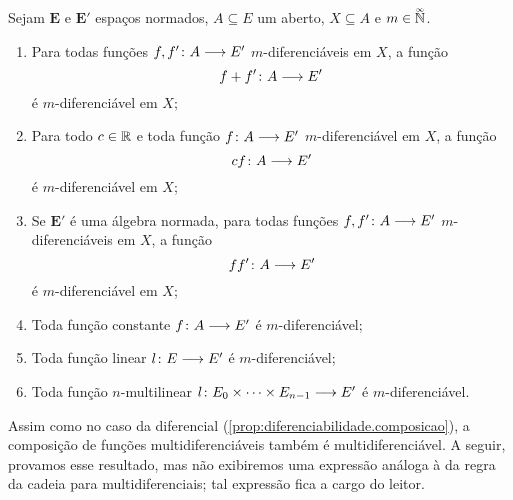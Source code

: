 \begin{exercise}
\label{prop:multidiferencial.propriedades}
Sejam $\bm E$ e $\bm E'$ espaços normados, $A \subseteq E$ um aberto, $X \subseteq A$ e $m \in \accentset{\infty}{\mathbb{N}}$.
	\begin{enumerate}
	\item Para todas funções ${f,f'}\colon {A} \longrightarrow {E'}$ $m$-diferenciáveis em $X$, a função
		\begin{equation*}
		{f+f'}\colon {A} \longrightarrow {E'}
		\end{equation*}
	é $m$-diferenciável em $X$;
	\item Para todo $c \in \mathbb{R}$ e toda função ${f}\colon {A} \longrightarrow {E'}$ $m$-diferenciável em $X$, a função
		\begin{equation*}
		{c f}\colon {A} \longrightarrow {E'}
		\end{equation*}
	é $m$-diferenciável em $X$;
	\item Se $\bm E'$ é uma álgebra normada, para todas funções ${f,f'}\colon {A} \longrightarrow {E'}$ $m$-diferenciáveis em $X$, a função
		\begin{equation*}
		{f f'}\colon {A} \longrightarrow {E'}
		\end{equation*}
	é $m$-diferenciável em $X$;
	\item Toda função constante ${f}\colon {A} \longrightarrow {E'}$ é $m$-diferenciável;
	\item Toda função linear ${l}\colon {E} \longrightarrow {E'}$ é $m$-diferenciável;
	\item Toda função $n$-multilinear ${l}\colon {E_0 \times \cdots \times E_{n-1}} \longrightarrow {E'}$ é $m$-diferenciável.
	\end{enumerate}
\end{exercise}

Assim como no caso da diferencial (\ref{prop:diferenciabilidade.composicao}), a composição de funções multidiferenciáveis também é multidiferenciável. A seguir, provamos esse resultado, mas não exibiremos uma expressão análoga à da regra da cadeia para multidiferenciais; tal expressão fica a cargo do leitor.


